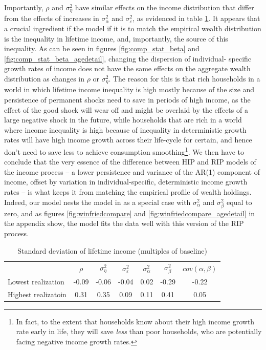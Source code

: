 Importantly, $\rho$ and $\sigma^2_{\eta}$ have similar effects on the income 
distribution that differ from the effects of increases in $\sigma^2_{\alpha}$ and
$\sigma^2_{\varepsilon}$, as evidenced in table \ref{tab:lifetime_dispersion}.
It appears that a crucial ingredient if the model if it is to match the empirical
wealth distribution is the inequality in lifetime income, and, importantly, the
source of this inequality. As can be seen in figures \ref{fig:comp_stat_beta} and
\ref{fig:comp_stat_beta_agedetail}, changing the dispersion of individual-
specific growth rates of income does not have the same effects on the 
aggregate wealth distribution as changes in $\rho$ or $\sigma^2_{\eta}$. The 
reason for this is that rich households in a world in which lifetime income 
inequality is high mostly because of the size and persistence of permanent shocks
need to save in periods of high income, as the effect of the good shock will wear
off and might be overlaid by the effects of a large negative shock in the future,
while households that are rich in a world where income inequality is high because
of inequality in deterministic growth rates will have high income growth across
their life-cycle for certain, and hence don't need to save less to achieve 
consumption smoothing\footnote{In fact, to the extent that households know about
their high income growth rate early in life, they will save \textit{less} than 
poor households, who are potentially facing negative income growth rates.}.
We then have to conclude that the very essence of the difference between HIP and
RIP models of the income process -- a lower persistence and variance of the AR(1)
component of income, offset by variation in individual-specific, deterministic
income growth rates -- is what keeps it from matching the empirical profile of
wealth holdings. Indeed, our model nests the model in \citet{HintermaierKoeniger2011}
as a special case with $\sigma^2_{\alpha}$ and $\sigma^2_{\beta}$ equal to zero,
and as figures \ref{fig:winfriedcompare} and \ref{fig:winfriedcompare_agedetail} in 
the appendix show, the model fits the data well with this version of the RIP 
process.

\begin{table}%
\begin{tabular}{|l|cccccc}
                    & $\rho$ & $\sigma^2_{\eta}$ & $\sigma^2_{\varepsilon}$ & $\sigma^2_{\alpha}$ & $\sigma^2_{\beta}$ & $cov(\alpha,\beta)$ \\
Lowest realization  & -0.09   &   -0.06           &   -0.04                  &     0.02            &     -0.29          &    -0.22   \\
Highest realizatoin &  0.31   &    0.35           &    0.09                  &     0.11            &      0.41          &     0.05   \\
\end{tabular}
\caption{Standard deviation of lifetime income (multiples of baseline)}
\label{tab:lifetime_dispersion}
\end{table}


